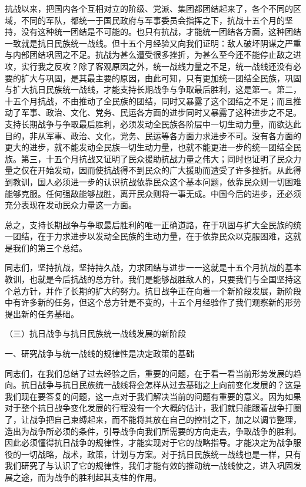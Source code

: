 抗战以来，把国内各个互相对立的阶级、党派、集团都团结起来了，各个不同的区域，不同的军队，都统一于国民政府与军事委员会指挥之下，抗战十五个月的坚持，没有这种统一团结是不可能的。也只有抗战，才能统一团结各方面，这种团结一致就是抗日民族统一战线。但十五个月经验又向我们证明：敌人破坏阴谋之严重与内部团结巩固之不足。抗战为甚么遭受很多挫折，为甚么至今还不能停止敌之进攻，实行我之反攻？除了客观原因之外，统一战线力量之不足，统一战线还没有必要的扩大与巩固，是其最主要的原因，由此可知，只有更加统一团结全民族，巩固与扩大抗日民族统一战线，才能支持长期战争与争取最后胜利，这是第一。第二，十五个月抗战，不由推动了全民族的团结，同时又暴露了这个团结之不足；而且推动了军事、政治、文化、党务、民运各方面的进步同时又暴露了这种进步之不足。支持长期战争与争取最后胜利，必须发动全民族各阶层中一切生动力量，而欲达此目的，非从军事、政治、文化，党务、民运等各方面力求进步不可。没有各方面的更大的进步，就不能发动全民族一切生动力量，也就不能更进一步的统一团结全民族。第三，十五个月抗战又证明了民众援助抗战力量之伟大；同时也证明了民众力量之仅在开始发动，因而使抗战得不到民众的广大援助而遭受了许多挫折。从此得到教训，国人必须进一步的认识抗战依靠民众这个基本问题，依靠民众则一切困难能够克服。任何强敌能够战胜，离开民众则将一事无成。中国今后的进步，还必须充分表现在发动民众力量这一方面。

总之，支持长期战争与争取最后胜利的唯一正确道路，在于巩固与扩大全民族的统一团结，在于力求进步以发动全民族的生动力量，在于依靠民众以克服困难，这就是我们的第三个总结。

同志们，坚持抗战，坚持持久战，力求团结与进步一一这就是十五个月抗战的基本教训，也就是今后抗战的总方针。我们是能够战胜敌人的，只要我们与全国坚持这个总方针，并作了长期的扩大的努力。抗日战争正在向着一个新阶段发展，新阶段中有许多新的任务，但这个总方针是不变的，十五个月经验作了我们观察新的形势提出新的任务基础。

（三）抗日战争与抗日民族统一战线发展的新阶段

一、研究战争与统一战线的规律性是决定政策的基础

同志们，在我们总结了过去经验之后，重要的问题，在于看一看当前形势发展的趋向。抗日战争与抗日民族统一战线将会怎样从过去基础之上向前变化发展的？这是我们现在要答复的问题，这一点对于我们解决当前的问题有重要的意义。因为如果对于整个抗日战争变化发展的行程没有一个大概的估计，我们就只能跟着战争打圈了，让战争把自己束缚起来，而不能将其放在自己的控制之下，加之以调节整理，造出为战争所必须的条件，引导战争向我们所需要的方向走去，争取战争的胜利。因此必须懂得抗日战争的规律性，才能实现对于它的战略指导。才能决定为战争服役的一切战略，战术，政策，计划与方案。对于抗日民族统一战线也是一样，只有我们研究了与认识了它的规律性，我们才能有效的推动统一战线使之，进入巩固发展之途，而为战争的胜利起其支柱的作用。

